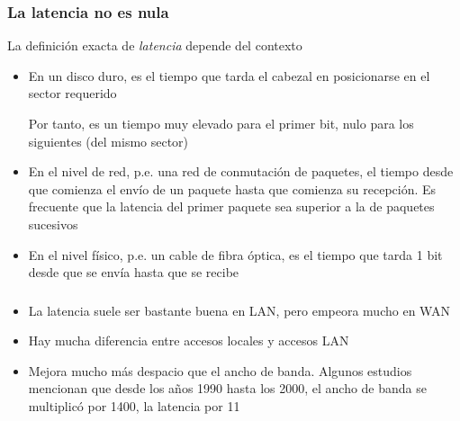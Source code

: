 \documentclass[ucs]{beamer}
\begin{document}
\begin{frame}[fragile]
\frametitle{La latencia no es nula}

La definición exacta de \emph{latencia} depende del contexto
\begin{itemize}
\item
En un disco duro, es el tiempo que tarda el cabezal en posicionarse en el sector
requerido

Por tanto, es un tiempo muy elevado para el primer bit, nulo para los siguientes
(del mismo sector)
\item
En el nivel de red, p.e. una red de conmutación de paquetes, el tiempo desde que comienza el envío
de un paquete hasta que comienza su recepción. Es frecuente que la latencia del 
primer paquete sea superior a la de paquetes sucesivos
\item
En el nivel físico, p.e. un cable de fibra óptica, es el tiempo que tarda 1 bit
desde que se envía hasta que se recibe

\end{itemize}


\end{frame}


\begin{frame}[fragile]
\frametitle{}
\begin{itemize}
\item
La latencia suele ser bastante buena en LAN, pero empeora mucho en WAN
\item
Hay mucha diferencia entre accesos locales y accesos LAN
\item
Mejora mucho más despacio que el ancho de banda. Algunos estudios mencionan que desde los años 1990 hasta
los 2000, el ancho de banda se multiplicó por 1400, la latencia por 11
\end{itemize}

\end{frame}
\end{document}
